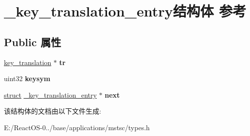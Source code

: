 \hypertarget{struct__key__translation__entry}{}\section{\+\_\+key\+\_\+translation\+\_\+entry结构体 参考}
\label{struct__key__translation__entry}
\subsection*{Public 属性}
\begin{DoxyCompactItemize}
\item 
\mbox{\label{struct__key__translation__entry_ac6648762a020dfdfabb04d2171e7b0bc}} 
\hyperlink{struct__key__translation}{key\+\_\+translation} $\ast$ {\bfseries tr}
\item 
\mbox{\label{struct__key__translation__entry_ad3f70858f274a5d5e60fe1badec84335}} 
uint32 {\bfseries keysym}
\item 
\mbox{\label{struct__key__translation__entry_afca95f063adbc54da6114cdc94597a54}} 
\hyperlink{interfacestruct}{struct} \hyperlink{struct__key__translation__entry}{\+\_\+key\+\_\+translation\+\_\+entry} $\ast$ {\bfseries next}
\end{DoxyCompactItemize}


该结构体的文档由以下文件生成\+:\begin{DoxyCompactItemize}
\item 
E\+:/\+React\+O\+S-\/0../base/applications/mstsc/types.\+h\end{DoxyCompactItemize}
